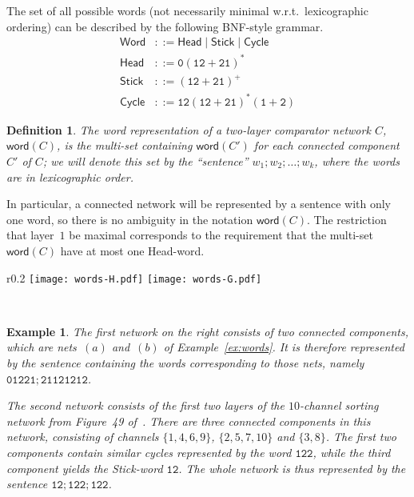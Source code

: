 \documentclass[10pt]{IEEEtran}
\newcommand{\word}{\mathsf{word}}
\newcommand{\sent}[1]{\ensuremath{\mathtt{#1}}} \newcommand{\GG}{{\cal G}}
\newtheorem{definition}{Definition}
\newtheorem{example}{Example}
\begin{document}
The set of all possible words (not necessarily minimal w.r.t.\ lexicographic ordering) can be described by the following BNF-style grammar.
\begin{align*}
  \mathsf{Word} &::= \mathsf{Head} \mid \mathsf{Stick} \mid \mathsf{Cycle}\\
  \mathsf{Head} &::= \sent{0}(\sent{12}+\sent{21})^\ast\\
   \mathsf{Stick} &::= (\sent{12}+\sent{21})^+ \\
   \mathsf{Cycle} &::= \sent{12}(\sent{12}+\sent{21})^\ast(\sent{1}+\sent{2})
\end{align*}

\begin{definition}
  The \emph{word representation} of a two-layer comparator network $C$, $\word(C)$, is the multi-set containing
  $\word(C')$ for each connected component $C'$ of $C$; we will denote this set
  by the ``sentence'' $w_1;w_2;\ldots;w_k$, where the words are in lexicographic
  order.
\end{definition}
In particular, a connected network will be represented by a sentence with only
one word, so there is no ambiguity in the notation $\word(C)$.  The
restriction that layer~$1$ be maximal corresponds to the requirement
that the multi-set $\word(C)$ have at most one Head-word.

\begin{wrapfigure}[9]{r}{0.2\textwidth}
  \vspace*{-3ex}
  \texttt{[image: words-H.pdf]}
  \quad
  \texttt{[image: words-G.pdf]}
\end{wrapfigure}
\ \vspace*{-\bigskipamount}

\begin{example}
  The first network on the right consists of two connected components,
  which are nets~$(a)$ and~$(b)$ of Example~\ref{ex:words}.
  It is therefore represented by the sentence containing the words
  corresponding to those nets, namely $\sent{01221;21121212}$.

  The second network consists of the first two layers of the $10$-channel
  sorting network from Figure~49 of~\cite{Knuth73}.  There are three
  connected components in this network, consisting of channels
  $\{1,4,6,9\}$, $\{2,5,7,10\}$ and $\{3,8\}$.  The first two components
  contain similar cycles represented by the word $\sent{122}$, while the
  third component yields the Stick-word $\sent{12}$.  The whole network
  is thus represented by the sentence $\sent{12;122;122}$.
\end{example}
\end{document}
